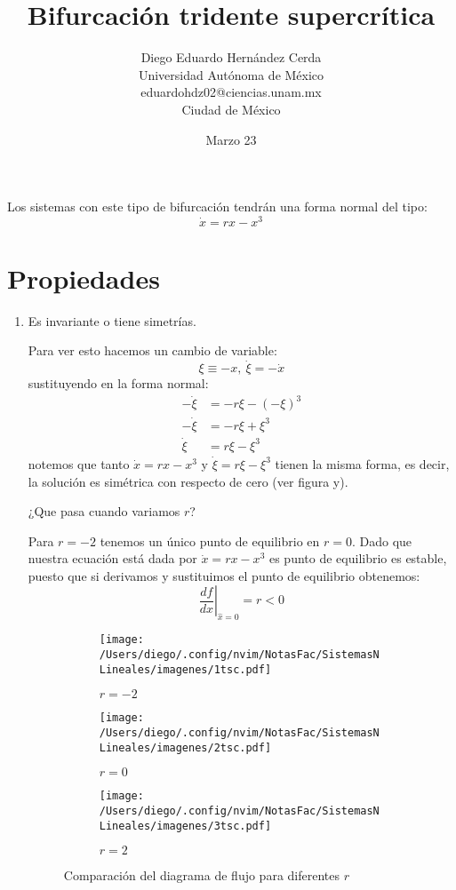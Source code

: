 \documentclass[12pt,letterpaper]{article}
\title{Bifurcación tridente supercrítica}
\author{Diego Eduardo Hernández Cerda\\
  \small Universidad Autónoma de México\\
  \small eduardohdz02@ciencias.unam.mx\\
  \small Ciudad de México
  \date{Marzo 23}
}
\begin{document}
\maketitle

\begin{tcolorbox}[colback=YellowGreen!10, colframe=YellowGreen, title=Forma normal]
Los sistemas con este tipo de bifurcación tendrán una forma normal del tipo:
$$
\dot{x}=rx-x^3 
$$			
\end{tcolorbox}

\section{Propiedades}

\begin{enumerate}
  \item Es invariante o tiene simetrías.
    
    Para ver esto hacemos un cambio de variable:
    $$
    \xi \equiv -x, \ \dot{\xi}=-\dot{x} 
    $$
    sustituyendo en la forma normal:
    $$
    \begin{aligned}
      - \dot{\xi} &= -r\xi-(-\xi)^3 \\
      - \dot{\xi}&=-r\xi+\xi^3 \\
      \dot{\xi} &=r\xi-\xi^3
    \end{aligned}
    $$
    notemos que tanto $\dot{x}=rx-x^3$ y $ \dot{\xi} = r\xi-\xi^3$ tienen la misma forma, es decir, la solución es simétrica con respecto de cero (ver figura y).

    ¿Que pasa cuando variamos $r$?
    
    Para $r=-2$ tenemos un único punto de equilibrio en  $r=0$. Dado que nuestra ecuación está dada por $\dot{x}=rx-x^3$ es punto de equilibrio es estable, puesto que si derivamos y sustituimos el punto de equilibrio obtenemos: $$
    \left. \frac{df}{dx} \right|_{\hat{x}=0} = r < 0 $$

      \begin{figure}[!tbp]
        \begin{subfigure}[b]{0.49\textwidth}
          \texttt{[image: /Users/diego/.config/nvim/NotasFac/SistemasNLineales/imagenes/1tsc.pdf]}
          \caption{$r=-2$}
        \end{subfigure}
        \hfill
        \begin{subfigure}[b]{0.49\textwidth}
          \texttt{[image: /Users/diego/.config/nvim/NotasFac/SistemasNLineales/imagenes/2tsc.pdf]}
          \caption{$r=0$}
        \end{subfigure}
        \begin{subfigure}[b]{0.49\textwidth}
          \texttt{[image: /Users/diego/.config/nvim/NotasFac/SistemasNLineales/imagenes/3tsc.pdf]}
          \caption{$r=2$}
        \end{subfigure}
        \caption{Comparación del diagrama de flujo para diferentes $r$}
      \end{figure}


\end{enumerate}
\end{document}
